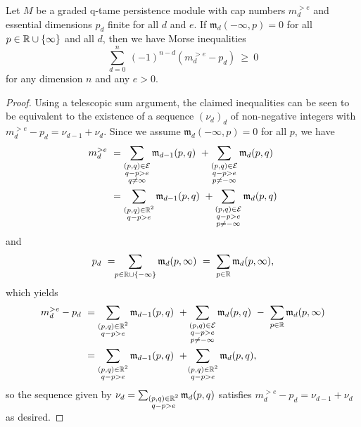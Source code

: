\begin{thm}
	Let $M$ be a graded q-tame persistence module with cap numbers $m_{d}^{> e }$ and essential dimensions $p_{d}$ finite for all $d$ and $e$.
	If $\mathfrak{m}_d(-\infty, p) = 0$ for all $p \in \mathbb{R} \cup \{\infty\}$ and all $d$, then we have Morse inequalities
    \begin{equation} \label{e:morse inequalities}
    \sum_{d=0}^n \ (-1)^{n-d} (m^{>e}_{d} - p_{d}) \ \geq\  0
    \end{equation}
    for any dimension $n$ and any $e > 0$.
\end{thm}

\begin{proof}
    Using a telescopic sum argument, the claimed inequalities can be seen to be equivalent to the existence of a sequence $(\nu_d)_d$ of non-negative integers with $m^{>e}_{d} - p_{d} = \nu_{d-1} + \nu_{d}$.
    Since we assume $\mathfrak{m}_d(-\infty, p) = 0$ for all $p$, we have
    \begin{align*}
    m^{>e}_{d}
    \ &=
    \sum_{\substack{(p,q) \in \mathcal{E} \\ q - p > e \\ q \neq \infty}} \mathfrak{m}_{d-1}(p,q)
    \ +
    \sum_{\substack{(p,q) \in \mathcal{E} \\ q - p > e \\ p \neq -\infty}}\mathfrak{m}_d(p,q)
    \\
    &=
    \sum_{\substack{(p,q) \in \mathbb{R}^2 \\ q - p > e }} \mathfrak{m}_{d-1}(p,q)
    \ +
    \sum_{\substack{(p,q) \in \mathcal{E} \\ q - p > e \\ p \neq -\infty}}\mathfrak{m}_d(p,q)
    \end{align*}
    and
    \begin{equation*}
    p_{d}
    \ = \!\!
    \sum_{p \in \mathbb{R} \cup \{-\infty\}} \mathfrak{m}_d(p,\infty)
    \ = \
    \sum_{p \in \mathbb{R}} \mathfrak{m}_d(p,\infty),
    \end{equation*}
    which yields
    \begin{align*}
    m^{>e}_{d} - p_{d} \
    &= 
    \sum_{\substack{(p,q) \in \mathbb{R}^2 \\ q - p > e }} \mathfrak{m}_{d-1}(p,q)
    \ +
    \sum_{\substack{(p,q) \in \mathcal{E} \\ q - p > e \\ p \neq -\infty}}\mathfrak{m}_d(p,q)
    \ - \
    \sum_{p \in \mathbb{R}} \mathfrak{m}_d(p,\infty)
    \\
    &=
    \sum_{\substack{(p,q) \in \mathbb{R}^2 \\ q - p > e }} \mathfrak{m}_{d-1}(p,q)
    \ + \!
    \sum_{\substack{(p,q) \in \mathbb{R}^2 \\ q - p > e }}\mathfrak{m}_d(p,q),
    \end{align*}
    so the sequence given by $\nu_d = \sum_{\substack{(p,q) \in \mathbb{R}^2 \\ q - p > e }}\mathfrak{m}_d(p,q)$ satisfies $m^{>e}_{d} - p_{d} = \nu_{d-1} + \nu_{d}$ as desired.
\end{proof}

